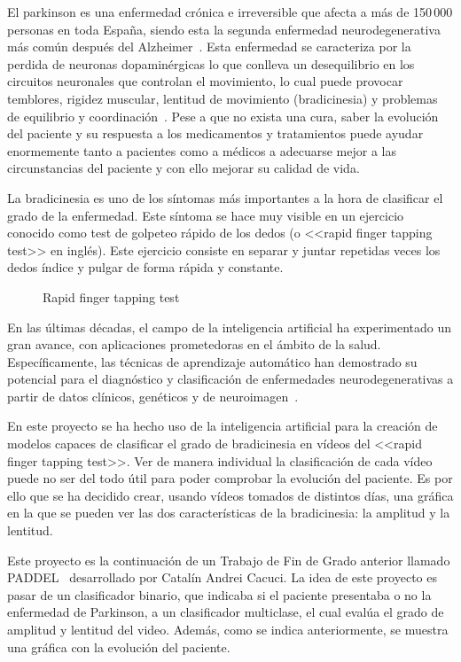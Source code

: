
El parkinson es una enfermedad crónica e irreversible que afecta a más de 150\,000 personas en toda España, siendo esta la segunda enfermedad neurodegenerativa más común después del Alzheimer~\cite{brainsci11081027}. Esta enfermedad se caracteriza por la perdida de neuronas dopaminérgicas lo que conlleva un desequilibrio en los circuitos neuronales que controlan el movimiento, lo cual puede provocar temblores, rigidez muscular, lentitud de movimiento (bradicinesia) y problemas de equilibrio y coordinación~\cite{Poewe_Seppi_Tanner_Halliday_Brundin_Volkmann_Schrag_Lang_2017}.
Pese a que no exista una cura, saber la evolución del paciente y su respuesta a los medicamentos y tratamientos puede ayudar enormemente tanto a pacientes como a médicos a adecuarse mejor a las circunstancias del paciente y con ello mejorar su calidad de vida.
 
La bradicinesia es uno de los síntomas más importantes a la hora de clasificar el grado de la enfermedad. Este síntoma se hace muy visible en un ejercicio conocido como test de golpeteo rápido de los dedos (o <<rapid finger tapping test>> en inglés). Este ejercicio consiste en separar y juntar repetidas veces los dedos índice y pulgar de forma rápida y constante.


\begin{figure}
    \centering
    \caption{Rapid finger tapping test}
    \label{fig:finger-tapping-test}
\end{figure}

En las últimas décadas, el campo de la inteligencia artificial ha experimentado un gran avance, con aplicaciones prometedoras en el ámbito de la salud. Específicamente, las técnicas de aprendizaje automático han demostrado su potencial para el diagnóstico y clasificación de enfermedades neurodegenerativas a partir de datos clínicos, genéticos y de neuroimagen~\cite{CardiacCare}.

En este proyecto se ha hecho uso de la inteligencia artificial para la creación de modelos capaces de clasificar el grado de bradicinesia en vídeos del <<rapid finger tapping test>>. Ver de manera individual la clasificación de cada vídeo puede no ser del todo útil para poder comprobar la evolución del paciente. Es por ello que se ha decidido crear, usando vídeos tomados de distintos días, una gráfica en la que se pueden ver las dos características de la bradicinesia: la amplitud y la lentitud. 

Este proyecto es la continuación de un Trabajo de Fin de Grado anterior llamado PADDEL~\cite{paddelRepo} desarrollado por Catalín Andrei Cacuci. La idea de este proyecto es pasar de un clasificador binario, que indicaba si el paciente presentaba o no la enfermedad de Parkinson, a un clasificador multiclase, el cual evalúa el grado de amplitud y lentitud del video. Además, como se indica anteriormente, se muestra una gráfica con la evolución del paciente.